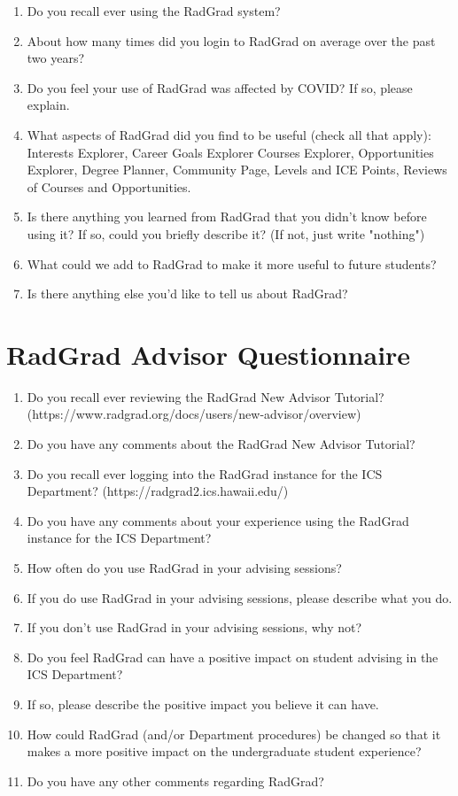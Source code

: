 \documentclass[acmsmall]{acmart}
\begin{document}
\begin{enumerate}[leftmargin=*]
\item Do you recall ever using the RadGrad system?
\item About how many times did you login to RadGrad on average over the past two years?
\item Do you feel your use of RadGrad was affected by COVID? If so, please explain.
\item What aspects of RadGrad did you find to be useful (check all that apply): Interests Explorer, Career Goals Explorer Courses Explorer, Opportunities Explorer, Degree Planner, Community Page, Levels and ICE Points, Reviews of Courses and Opportunities.
\item Is there anything you learned from RadGrad that you didn't know before using it? If so, could you briefly describe it? (If not, just write "nothing")
\item What could we add to RadGrad to make it more useful to future students?
\item Is there anything else you'd like to tell us about RadGrad?
\end{enumerate}

\section{RadGrad Advisor Questionnaire}
\label{sec:advisor-questionnaire}

\begin{enumerate}[leftmargin=*]
\item Do you recall ever reviewing the RadGrad New Advisor Tutorial? \newline (https://www.radgrad.org/docs/users/new-advisor/overview)
\item Do you have any comments about the RadGrad New Advisor Tutorial?
\item Do you recall ever logging into the RadGrad instance for the ICS Department? \newline (https://radgrad2.ics.hawaii.edu/)
\item Do you have any comments about your experience using the RadGrad instance for the ICS Department?
\item How often do you use RadGrad in your advising sessions?
\item If you do use RadGrad in your advising sessions, please describe what you do.
\item If you don't use RadGrad in your advising sessions, why not?
\item Do you feel RadGrad can have a positive impact on student advising in the ICS Department?
\item If so, please describe the positive impact you believe it can have.
\item How could RadGrad (and/or Department procedures) be changed so that it makes a more positive impact on the undergraduate student experience?
\item Do you have any other comments regarding RadGrad?
\end{enumerate}
\end{document}
